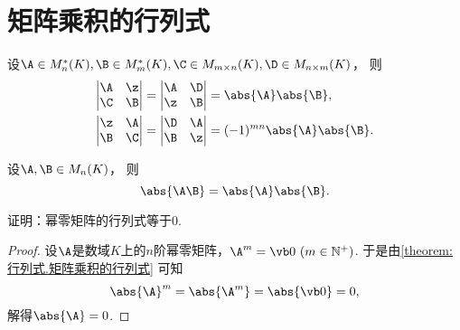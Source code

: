 \section{矩阵乘积的行列式}
\begin{lemma}
设\(\A\in M_n^*(K),
\B\in M_m^*(K),
\C\in M_{m\times n}(K),
\D\in M_{n\times m}(K)\)，
则\begin{align}
	\begin{vmatrix}
		\A & \z \\
		\C & \B
	\end{vmatrix}
	&= \begin{vmatrix}
		\A & \D \\
		\z & \B
	\end{vmatrix}
	= \abs{\A} \abs{\B}, \label{equation:行列式.广义三角阵的行列式1} \\
	\begin{vmatrix}
		\z & \A \\
		\B & \C
	\end{vmatrix}
	&= \begin{vmatrix}
		\D & \A \\
		\B & \z
	\end{vmatrix}
	= (-1)^{mn} \abs{\A} \abs{\B}. \label{equation:行列式.广义三角阵的行列式2}
\end{align}
\end{lemma}

\begin{theorem}[矩阵乘积的行列式定理]\label{theorem:行列式.矩阵乘积的行列式}
设\(\A,\B\in M_n(K)\)，
则\begin{equation}
	\abs{\A \B} = \abs{\A} \abs{\B}.
\end{equation}
\end{theorem}

\begin{example}\label{example:幂零矩阵.幂零矩阵的行列式}
证明：幂零矩阵的行列式等于\(0\).
\begin{proof}
设\(\A\)是数域\(K\)上的\(n\)阶幂零矩阵，\(\A^m = \vb0\ (m\in\mathbb{N}^+)\).
于是由\cref{theorem:行列式.矩阵乘积的行列式} 可知\[
	\abs{\A}^m
	= \abs{\A^m}
	= \abs{\vb0}
	= 0,
\]
解得\(\abs{\A} = 0\).
\end{proof}
\end{example}

